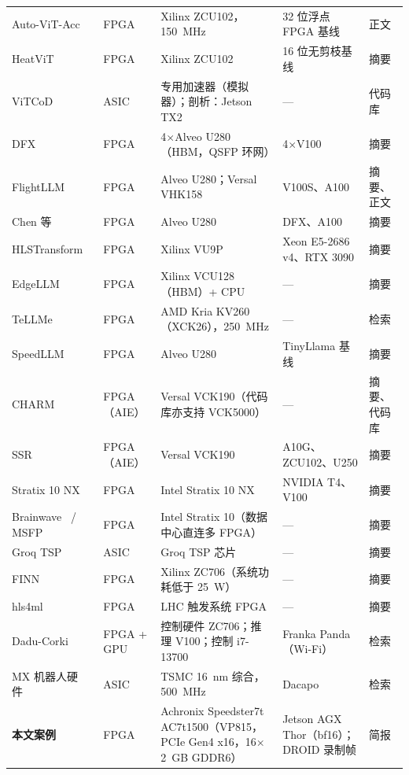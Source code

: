 \documentclass[a4paper,10.5pt]{ctexart}
\begin{document}
\begin{small}
\begin{longtable}{p{2.2cm} p{1.5cm} p{4.6cm} p{3.6cm} p{1.9cm}}
Auto-ViT-Acc~\cite{autovitacc} & FPGA & Xilinx ZCU102，150~MHz & 32 位浮点 FPGA 基线 & 正文 \\
HeatViT~\cite{heatvit} & FPGA & Xilinx ZCU102 & 16 位无剪枝基线 & 摘要 \\
ViTCoD~\cite{vitcod} & ASIC & 专用加速器（模拟器）；剖析：Jetson TX2 & — & 代码库 \\
DFX~\cite{dfx} & FPGA & 4$\times$Alveo U280（HBM，QSFP 环网） & 4$\times$V100 & 摘要 \\
FlightLLM~\cite{flightllm} & FPGA & Alveo U280；Versal VHK158 & V100S、A100 & 摘要、正文 \\
Chen 等~\cite{chen2024trets} & FPGA & Alveo U280 & DFX、A100 & 摘要 \\
HLSTransform~\cite{hlstransform} & FPGA & Xilinx VU9P & Xeon E5-2686 v4、RTX 3090 & 摘要 \\
EdgeLLM~\cite{edgellm} & FPGA & Xilinx VCU128（HBM）+ CPU & — & 摘要 \\
TeLLMe~\cite{tellme} & FPGA & AMD Kria KV260（XCK26），250~MHz & — & 检索 \\
SpeedLLM~\cite{speedllm} & FPGA & Alveo U280 & TinyLlama 基线 & 摘要 \\
CHARM~\cite{charm} & FPGA（AIE） & Versal VCK190（代码库亦支持 VCK5000） & — & 摘要、代码库 \\
SSR~\cite{ssr} & FPGA（AIE） & Versal VCK190 & A10G、ZCU102、U250 & 摘要 \\
Stratix 10 NX~\cite{s10nx_fpt} & FPGA & Intel Stratix 10 NX & NVIDIA T4、V100 & 摘要 \\
Brainwave~\cite{brainwave} / MSFP~\cite{msfp} & FPGA & Intel Stratix 10（数据中心直连多 FPGA） & — & 摘要 \\
Groq TSP~\cite{groq} & ASIC & Groq TSP 芯片 & — & 摘要 \\
FINN~\cite{finn} & FPGA & Xilinx ZC706（系统功耗低于 25~W） & — & 摘要 \\
hls4ml~\cite{hls4ml} & FPGA & LHC 触发系统 FPGA & — & 摘要 \\
Dadu-Corki~\cite{corki} & FPGA + GPU & 控制硬件 ZC706；推理 V100；控制 i7-13700 & Franka Panda（Wi-Fi） & 检索 \\
MX 机器人硬件~\cite{mxrobot} & ASIC & TSMC 16~nm 综合，500~MHz & Dacapo & 检索 \\
\textbf{本文案例} & FPGA & Achronix Speedster7t AC7t1500（VP815，PCIe Gen4 x16，16$\times$2~GB GDDR6） & Jetson AGX Thor（bf16）；DROID 录制帧 & 简报 \\
\end{longtable}
\end{small}
\end{document}
